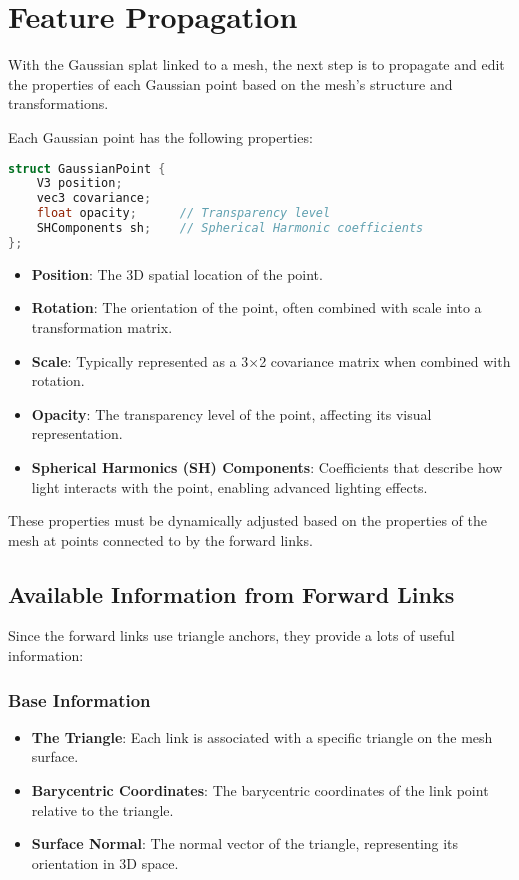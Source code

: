 \chapter{Feature Propagation}

\label{feature-propagation}

With the Gaussian splat linked to a mesh, the next step is to propagate and edit the properties of each Gaussian point based on the mesh's structure and transformations.

Each Gaussian point has the following properties:

\begin{lstlisting}[language=C++, caption={Gaussian Point Structure}, label={lst:gaussian_properties}]
struct GaussianPoint {
    V3 position;
    vec3 covariance;
    float opacity;      // Transparency level
    SHComponents sh;    // Spherical Harmonic coefficients
};
\end{lstlisting}

\begin{itemize}
    \item \textbf{Position}: The 3D spatial location of the point.
    \item \textbf{Rotation}: The orientation of the point, often combined with scale into a transformation matrix.
    \item \textbf{Scale}: Typically represented as a 3×2 covariance matrix when combined with rotation.
    \item \textbf{Opacity}: The transparency level of the point, affecting its visual representation.
    \item \textbf{Spherical Harmonics (SH) Components}: Coefficients that describe how light interacts with the point, enabling advanced lighting effects.
\end{itemize}

These properties must be dynamically adjusted based on the properties of the mesh at points connected to by the forward links.

\section{Available Information from Forward Links}

Since the forward links use triangle anchors, they provide a lots of useful information:

\subsection*{Base Information}
\begin{itemize}
    \item \textbf{The Triangle}: Each link is associated with a specific triangle on the mesh surface.
    \item \textbf{Barycentric Coordinates}: The barycentric coordinates of the link point relative to the triangle.
    \item \textbf{Surface Normal}: The normal vector of the triangle, representing its orientation in 3D space.
\end{itemize}


